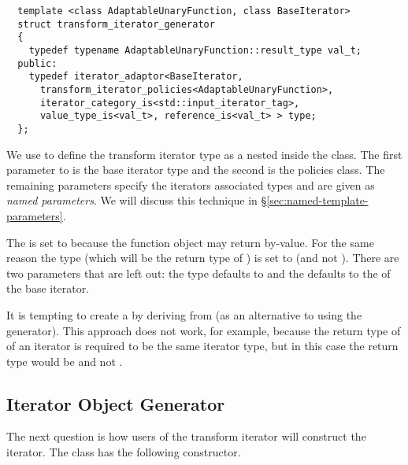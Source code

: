 \documentclass{netobjectdays}
\begin{document}
{\footnotesize
\begin{verbatim}
  template <class AdaptableUnaryFunction, class BaseIterator>
  struct transform_iterator_generator
  {
    typedef typename AdaptableUnaryFunction::result_type val_t;
  public:
    typedef iterator_adaptor<BaseIterator, 
      transform_iterator_policies<AdaptableUnaryFunction>,
      iterator_category_is<std::input_iterator_tag>, 
      value_type_is<val_t>, reference_is<val_t> > type;
  };
\end{verbatim}
}

We use  to define the transform iterator type
as a nested  inside the
 class. The first parameter
to  is the base iterator type and the second
is the policies class. The remaining parameters specify the iterators
associated types and are given as \emph{named parameters}.  We will
discuss this technique in \S\ref{sec:named-template-parameters}.

The  is set to
 because the function object may
return by-value. For the same reason the  type (which
will be the return type of ) is set to 
(and not ). There are two parameters that are left out:
the  type defaults to  and the
 defaults to the  of
the base iterator.

It is tempting to create a  by deriving
from  (as an alternative to using the
generator).  This approach does not work, for example, because the
return type of  of an iterator is required to be the
same iterator type, but in this case the return type would be
 and not .


\subsection{Iterator Object Generator}
\label{sec:iter-object-generator}

The next question is how users of the transform iterator will
construct the iterator. The  class has the
following constructor.
\end{document}
